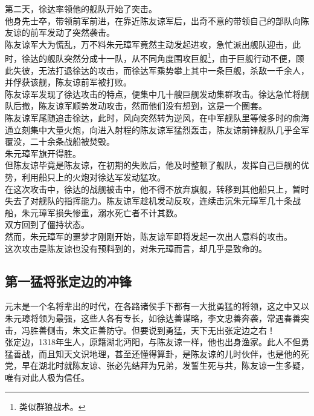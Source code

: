 \begin{multicols}{\theparacolNo}
第二天，徐达率领他的舰队开始了突击。\\

他身先士卒，带领前军前进，在靠近陈友谅军后，出奇不意的带领自己的部队向陈友谅的前军发动了突然袭击。\\

陈友谅军大为慌乱，万不料朱元璋军竟然主动发起进攻，急忙派出舰队迎击，此时，徐达的舰队突然分成十一队，从不同角度围攻巨舰\footnote{类似群狼战术。}，由于巨舰行动不便，顾此失彼，无法打退徐达的攻击，而徐达军乘势攀上其中一条巨舰，杀敌一千余人，并俘获该舰，陈友谅前军被打败。\\

陈友谅军发现了徐达攻击的特点，便集中几十艘巨舰发动集群攻击。徐达急忙将舰队后撤，陈友谅军顺势发动攻击，然而他们没有想到，这是一个圈套。\\

陈友谅军尾随追击徐达，此时，风向突然转为逆风，在中军舰队里等候多时的俞海通立刻集中大量火炮，向进入射程的陈友谅军猛烈轰击，陈友谅前锋舰队几乎全军覆没，二十余条战船被焚毁。\\

朱元璋军旗开得胜。\\

但陈友谅毕竟是陈友谅，在初期的失败后，他及时整顿了舰队，发挥自己巨舰的优势，利用船只上的火炮对徐达军发动猛攻。\\

在这次攻击中，徐达的战舰被击中，他不得不放弃旗舰，转移到其他船只上，暂时失去了对舰队的指挥能力。陈友谅军趁机发动反攻，连续击沉朱元璋军几十条战船，朱元璋军损失惨重，溺水死亡者不计其数。\\

双方回到了僵持状态。\\

然而，朱元璋军的噩梦才刚刚开始，陈友谅军即将发起一次出人意料的攻击。\\

这次攻击是陈友谅也没有预料到的，对朱元璋而言，却几乎是致命的。\\

\subsection{第一猛将张定边的冲锋}
元末是一个名将辈出的时代，在各路诸侯手下都有一大批勇猛的将领，这之中又以朱元璋将领为最强，这些人各有专长，如徐达善谋略，李文忠善奔袭，常遇春善突击，冯胜善侧击，朱文正善防守。但要说到勇猛，天下无出张定边之右！\\

张定边，1318年生人，原籍湖北沔阳，与陈友谅一样，他也出身渔家。此人不但勇猛善战，而且知天文识地理，甚至还懂得算卦，是陈友谅的儿时伙伴，也是他的死党，早在湖北时就陈友谅、张必先结拜为兄弟，发誓生死与共，陈友谅一生多疑，唯有对此人极为信任。\\


\end{multicols}

